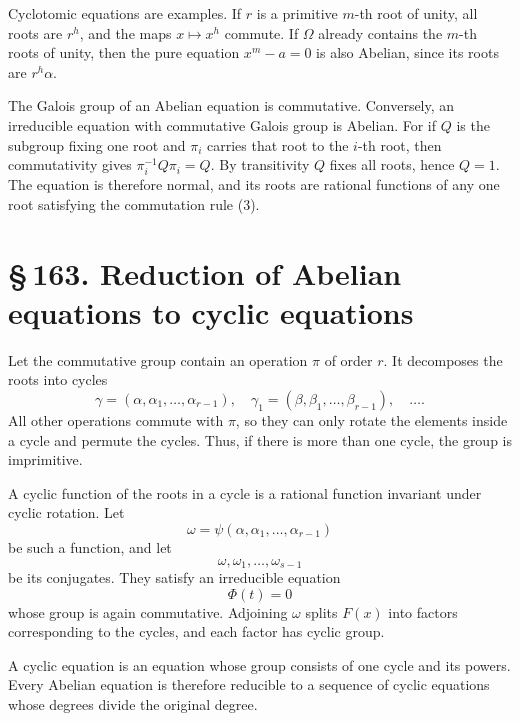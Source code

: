 \documentclass[11pt]{article}
\providecommand{\sect}[2]{\section*{\S\,#1. #2}}
\begin{document}
Cyclotomic equations are examples. If $r$ is a primitive $m$-th root of unity, all roots are $r^h$, and the maps $x\mapsto x^h$ commute. If $\Omega$ already contains the $m$-th roots of unity, then the pure equation $x^m-a=0$ is also Abelian, since its roots are $r^h\alpha$.

The Galois group of an Abelian equation is commutative. Conversely, an irreducible equation with commutative Galois group is Abelian. For if $Q$ is the subgroup fixing one root and $\pi_i$ carries that root to the $i$-th root, then commutativity gives $\pi_i^{-1}Q\pi_i=Q$. By transitivity $Q$ fixes all roots, hence $Q=1$. The equation is therefore normal, and its roots are rational functions of any one root satisfying the commutation rule (3).

\sect{163}{Reduction of Abelian equations to cyclic equations}

Let the commutative group contain an operation $\pi$ of order $r$. It decomposes the roots into cycles
\[
        \gamma=(\alpha,\alpha_1,
        \ldots,\alpha_{r-1}),
        \quad
        \gamma_1=(\beta,\beta_1,
        \ldots,\beta_{r-1}),
        \quad\ldots .                                                   \tag{1}
\]
All other operations commute with $\pi$, so they can only rotate the elements inside a cycle and permute the cycles. Thus, if there is more than one cycle, the group is imprimitive.

A cyclic function of the roots in a cycle is a rational function invariant under cyclic rotation. Let
\[
        \omega=\psi(\alpha,\alpha_1,
        \ldots,\alpha_{r-1})                                            \tag{4}
\]
be such a function, and let
\[
        \omega,\omega_1,
        \ldots,
        \omega_{s-1}                                                    \tag{5}
\]
be its conjugates. They satisfy an irreducible equation
\[
        \Phi(t)=0                                                       \tag{7}
\]
whose group is again commutative. Adjoining $\omega$ splits $F(x)$ into factors corresponding to the cycles, and each factor has cyclic group.

A cyclic equation is an equation whose group consists of one cycle and its powers. Every Abelian equation is therefore reducible to a sequence of cyclic equations whose degrees divide the original degree.
\end{document}
